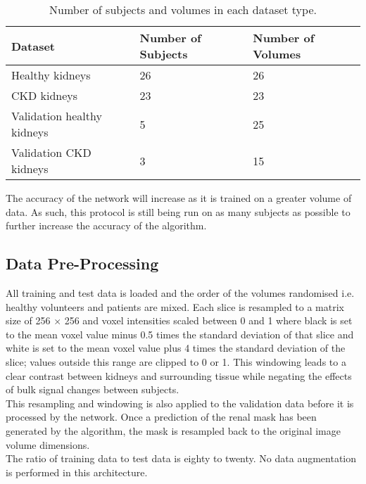 \begin{table}[H]
	\centering
	\begin{tabular}{|l|l|l|}
		\hline
		\textbf{Dataset}           & \textbf{Number of Subjects} & \textbf{Number of Volumes} \\ \hline
		Healthy kidneys            & 26                            & 26                         \\ \hline
		\ac{CKD} kidneys           & 23                            & 23                         \\ \hline
		Validation healthy kidneys & 5                             & 25                         \\ \hline
		Validation \ac{CKD} kidneys& 3                             & 15                         \\ \hline
	\end{tabular}
	\caption{Number of subjects and volumes in each dataset type.}
	\label{tab:ml_data}
\end{table}

The accuracy of the network will increase as it is trained on a greater volume of data. As such, this protocol is still being run on as many subjects as possible to further increase the accuracy of the algorithm.

\subsection{Data Pre-Processing}
All training and test data is loaded and the order of the volumes randomised i.e. healthy volunteers and patients are mixed. Each slice is resampled to a matrix size of 256 $\times$ 256 and voxel intensities scaled between 0 and 1 where black is set to the mean voxel value minus 0.5 times the standard deviation of that slice and white is set to the mean voxel value plus 4 times the standard deviation of the slice; values outside this range are clipped to 0 or 1. This windowing leads to a clear contrast between kidneys and surrounding tissue while negating the effects of bulk signal changes between subjects.\\

This resampling and windowing is also applied to the validation data before it is processed by the network. Once a prediction of the renal mask has been generated by the algorithm, the mask is resampled back to the original image volume dimensions.\\

The ratio of training data to test data is eighty to twenty. No data augmentation is performed in this architecture.\\

